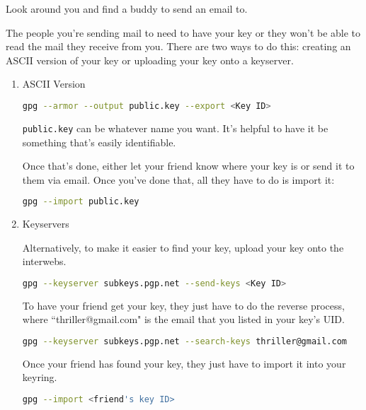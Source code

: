 \documentclass[11pt,a4paper]{article}
\begin{document}
\indent\indent Look around you and find a buddy to send an email to.

The people you're sending mail to need to have your key or they won't be able to read the mail they receive from you. There are two ways to do this: creating an ASCII version of your key or uploading your key onto a keyserver. 

\begin{enumerate}

\item ASCII Version

\begin{lstlisting}[basicstyle=\ttfamily, backgroundcolor = \color{lightgray}, language = bash, xleftmargin = 0cm, framexleftmargin = 1em]
gpg --armor --output public.key --export <Key ID>
\end{lstlisting}

\verb|public.key| can be whatever name you want. It's helpful to have it be something that's easily identifiable. 

Once that's done, either let your friend know where your key is or send it to them via email. Once you've done that, all they have to do is import it: 

\begin{lstlisting}[basicstyle=\ttfamily, backgroundcolor = \color{lightgray}, language = bash, xleftmargin = 0cm, framexleftmargin = 1em]
gpg --import public.key
\end{lstlisting}

\item Keyservers

Alternatively, to make it easier to find your key, upload your key onto the interwebs.

\begin{lstlisting}[basicstyle=\ttfamily, backgroundcolor = \color{lightgray}, language = bash, xleftmargin = 0cm, framexleftmargin = 1em]
gpg --keyserver subkeys.pgp.net --send-keys <Key ID>
\end{lstlisting}

To have your friend get your key, they just have to do the reverse process, where ``thriller@gmail.com" is the email that you listed in your key's UID. 

\begin{lstlisting}[basicstyle=\ttfamily, backgroundcolor = \color{lightgray}, language = bash, xleftmargin = 0cm, framexleftmargin = 1em]
gpg --keyserver subkeys.pgp.net --search-keys thriller@gmail.com
\end{lstlisting}

Once your friend has found your key, they just have to import it into your keyring. 

\begin{lstlisting}[basicstyle=\ttfamily, backgroundcolor = \color{lightgray}, language = bash, xleftmargin = 0cm, framexleftmargin = 1em]
gpg --import <friend's key ID>
\end{lstlisting}


\end{enumerate}
\end{document}
